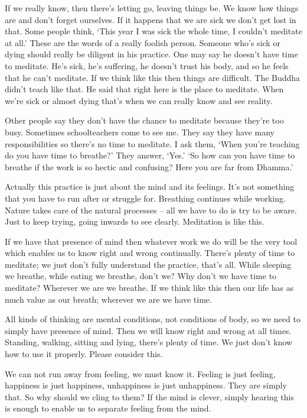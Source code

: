 If we really know, then there's letting go, leaving things be. We know how things are and don't forget ourselves. If it happens that we are sick we don't get lost in that. Some people think, `This year I was sick the whole time, I couldn't meditate at all.' These are the words of a really foolish person. Someone who's sick or dying should really be diligent in his practice. One may say he doesn't have time to meditate. He's sick, he's suffering, he doesn't trust his body, and so he feels that he can't meditate. If we think like this then things are difficult. The Buddha didn't teach like that. He said that right here is the place to meditate. When we're sick or almost dying that's when we can really know and see reality. 

Other people say they don't have the chance to meditate because they're too busy. Sometimes schoolteachers come to see me. They say they have many responsibilities so there's no time to meditate. I ask them, `When you're teaching do you have time to breathe?' They answer, `Yes.' `So how can you have time to breathe if the work is so hectic and confusing? Here you are far from Dhamma.' 

Actually this practice is just about the mind and its feelings. It's not something that you have to run after or struggle for. Breathing continues while working. Nature takes care of the natural processes -- all we have to do is try to be aware. Just to keep trying, going inwards to see clearly. Meditation is like this. 

If we have that presence of mind then whatever work we do will be the very tool which enables us to know right and wrong continually. There's plenty of time to meditate; we just don't fully understand the practice, that's all. While sleeping we breathe, while eating we breathe, don't we? Why don't we have time to meditate? Wherever we are we breathe. If we think like this then our life has as much value as our breath; wherever we are we have time.

All kinds of thinking are mental conditions, not conditions of body, so we need to simply have presence of mind. Then we will know right and wrong at all times. Standing, walking, sitting and lying, there's plenty of time. We just don't know how to use it properly. Please consider this. 

We can not run away from feeling, we must know it. Feeling is just feeling, happiness is just happiness, unhappiness is just unhappiness. They are simply that. So why should we cling to them? If the mind is clever, simply hearing this is enough to enable us to separate feeling from the mind. 

